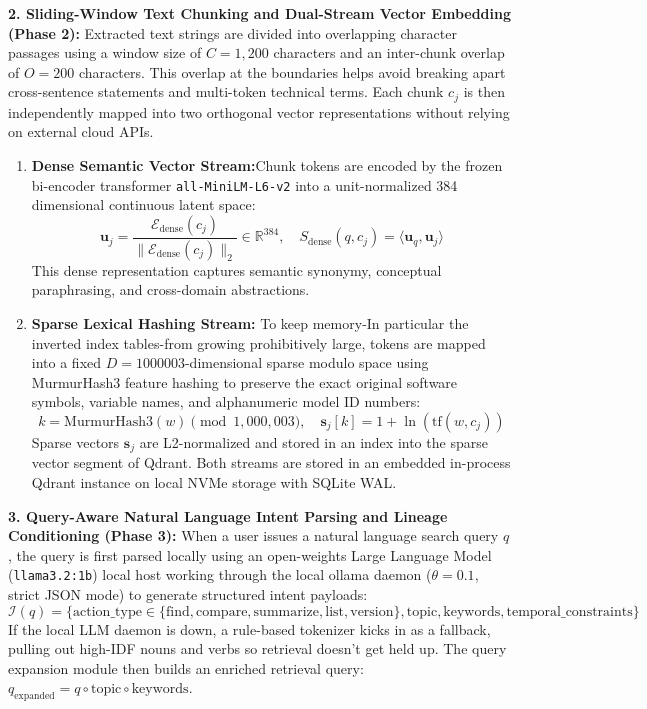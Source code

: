 \documentclass[a4paper,12pt]{article}
\begin{document}
\vspace{0.4em}
\noindent\textbf{2. Sliding-Window Text Chunking and Dual-Stream Vector Embedding (Phase 2):}
Extracted text strings are divided into overlapping character passages using a window size of $C = 1,200$ characters and an inter-chunk overlap of $O = 200$ characters. This overlap at the boundaries helps avoid breaking apart cross-sentence statements and multi-token technical terms. Each chunk $c_j$ is then independently mapped into two orthogonal vector representations without relying on external cloud APIs.
\begin{enumerate}
    \setlength{\itemsep}{2pt}
    \setlength{\parskip}{0pt}
    \item \textbf{Dense Semantic Vector Stream:}Chunk tokens are encoded by the frozen bi-encoder transformer \texttt{all-MiniLM-L6-v2} into a unit-normalized 384 dimensional continuous latent space:
    \begin{equation}
    \mathbf{u}_j = \frac{\mathcal{E}_{\text{dense}}(c_j)}{\|\mathcal{E}_{\text{dense}}(c_j)\|_2} \in \mathbb{R}^{384}, \quad S_{\text{dense}}(q, c_j) = \langle \mathbf{u}_q, \mathbf{u}_j \rangle
    \end{equation}
    This dense representation captures semantic synonymy, conceptual paraphrasing, and cross-domain abstractions.
    \item \textbf{Sparse Lexical Hashing Stream:} To keep memory-In particular the inverted index tables-from growing prohibitively large, tokens are mapped into a fixed $D = 1 000 003$-dimensional sparse modulo space using MurmurHash3 feature hashing to preserve the exact original software symbols, variable names, and alphanumeric model ID numbers:
    \begin{equation}
    k = \text{MurmurHash3}(w) \pmod{1,000,003}, \quad \mathbf{s}_j[k] = 1 + \ln(\text{tf}(w, c_j))
    \end{equation}
  Sparse vectors $\mathbf{s}_j$ are L2-normalized and stored in an index into the sparse vector segment of Qdrant. Both streams are stored in an embedded in-process Qdrant instance on local NVMe storage with SQLite WAL.
\end{enumerate}

\vspace{0.4em}
\noindent\textbf{3. Query-Aware Natural Language Intent Parsing and Lineage Conditioning (Phase 3):}
When a user issues a natural language search query $q$, the query is first parsed locally using an open-weights Large Language Model (\texttt{llama3.2:1b}) local host working through the local ollama daemon ($\theta = 0.1$, strict JSON mode) to generate structured intent payloads:
\begin{equation}
\mathcal{I}(q) = \{\text{action\_type} \in \{\text{find}, \text{compare}, \text{summarize}, \text{list}, \text{version}\}, \text{topic}, \text{keywords}, \text{temporal\_constraints}\}
\end{equation}
If the local LLM daemon is down, a rule-based tokenizer kicks in as a fallback, pulling out high-IDF nouns and verbs so retrieval doesn't get held up. The query expansion module then builds an enriched retrieval query: $q_{\text{expanded}} = q \circ \text{topic} \circ \text{keywords}$.
\end{document}
